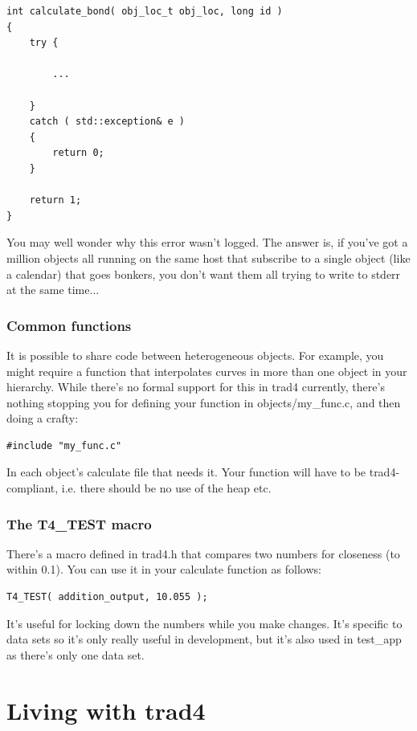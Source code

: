 \documentclass{report}
\begin{document}
\begin{verbatim}
int calculate_bond( obj_loc_t obj_loc, long id )
{
    try {

        ...

    }
    catch ( std::exception& e )
    {
        return 0;
    }

    return 1;
}
\end{verbatim}

You may well wonder why this error wasn't logged. The answer is, if you've got a million objects all running on the same host that subscribe to a single object (like a calendar) that goes bonkers, you don't want them all trying to write to stderr at the same time...



\subsection{Common functions}
It is possible to share code between heterogeneous objects. For example, you might require a function that interpolates curves in more than one object in your hierarchy. While there's no formal support for this in trad4 currently, there's nothing stopping you for defining your function in objects/my_func.c, and then doing a crafty:

\begin{verbatim}
#include "my_func.c"
\end{verbatim}

In each object's calculate file that needs it. Your function will have to be trad4-compliant, i.e. there should be no use of the heap etc. 

\subsection{The T4_TEST macro}

There's a macro defined in trad4.h that compares two numbers for closeness (to within 0.1). You can use it in your calculate function as follows:

\begin{verbatim}
T4_TEST( addition_output, 10.055 );
\end{verbatim}

It's useful for locking down the numbers while you make changes. It's specific to data sets so it's only really useful in development, but it's also used in test_app as there's only one data set.

\chapter{Living with trad4}
\end{document}
